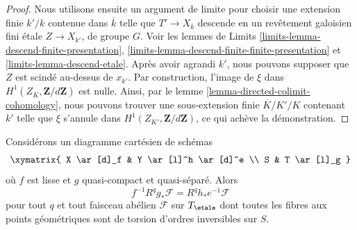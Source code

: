 \begin{proof}
\medskip\noindent
Nous utilisons ensuite un argument de limite pour choisir une extension finie $k'/k$
contenue dans $\overline{k}$ telle que $T' \to X_{\overline{k}}$
descende en un revêtement galoisien fini étale $Z \to X_{k'}$, de groupe $G$.
Voir les lemmes de Limits \ref{limits-lemma-descend-finite-presentation},
\ref{limits-lemma-descend-finite-finite-presentation} et
\ref{limits-lemma-descend-etale}.
Après avoir agrandi $k'$, nous pouvons supposer que $Z$ est scindé au-dessus de $x_{k'}$.
Par construction, l'image de $\xi$ dans
$H^1(Z_{\overline{K}}, \mathbf{Z}/d\mathbf{Z})$ est nulle.
Ainsi, par le lemme \ref{lemma-directed-colimit-cohomology},
nous pouvons trouver une sous-extension finie $\overline{K}/K'/K$
contenant $k'$ telle que $\xi$ s'annule dans $H^1(Z_{K'}, \mathbf{Z}/d\mathbf{Z})$,
ce qui achève la démonstration.
\end{proof}

\begin{theorem}
\label{theorem-smooth-base-change}
Considérons un diagramme cartésien de schémas
$$
\xymatrix{
X \ar[d]_f & Y \ar[l]^h \ar[d]^e \\
S & T \ar[l]_g
}
$$
où $f$ est lisse et $g$ quasi-compact et quasi-séparé. Alors
$$
f^{-1}R^qg_*\mathcal{F} = R^qh_*e^{-1}\mathcal{F}
$$
pour tout $q$ et tout faisceau abélien $\mathcal{F}$
sur $T_\etale$ dont toutes les fibres aux points géométriques sont de torsion
d'ordres inversibles sur $S$.
\end{theorem}

